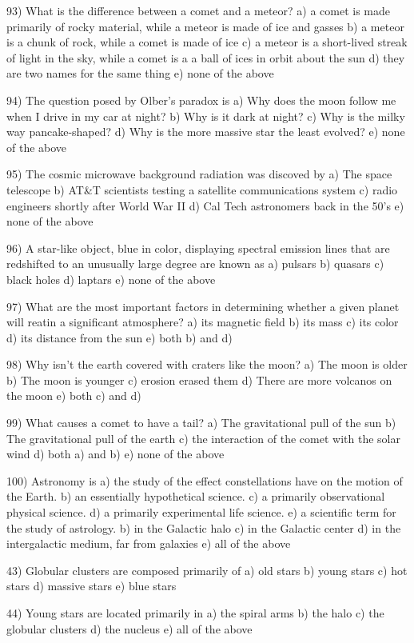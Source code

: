 93) What is the difference between a comet and a meteor?
a) a comet is made primarily of rocky material, while a meteor
is made of ice and gasses
b) a meteor is a chunk of rock, while a comet is made of ice
c) a meteor is a short-lived streak of light in the sky, while
a comet is a a ball of ices in orbit about the sun
d) they are two names for the same thing
e) none of the above

94) The question posed by Olber's paradox is
a) Why does the moon follow me when I drive in my car at night?
b) Why is it dark at night?
c) Why is the milky way pancake-shaped?
d) Why is the more massive star the least evolved?
e) none of the above

95) The cosmic microwave background radiation was discoved by
a) The space telescope
b) AT&T scientists testing a satellite communications system
c) radio engineers shortly after World War II
d) Cal Tech astronomers back in the 50's
e) none of the above

96) A star-like object, blue in color, displaying spectral emission lines
that are redshifted to an unusually large degree are known as
a) pulsars b) quasars c) black holes d) laptars e) none of the above

97) What are the most important factors in determining whether a given planet
will reatin a significant atmosphere?
a) its magnetic field
b) its mass
c) its color
d) its distance from the sun
e) both b) and d)

98) Why isn't the earth covered with craters like the moon?
a) The moon is older
b) The moon is younger
c) erosion erased them
d) There are more volcanos on the moon
e) both c) and d)

99) What causes a comet to have a tail?
a) The gravitational pull of the sun
b) The gravitational pull of the earth
c) the interaction of the comet with the solar wind
d) both a) and b)
e) none of the above

100) Astronomy is
a) the study of the effect constellations have on the motion of the Earth.
b) an essentially hypothetical science.
c) a primarily observational physical science.
d) a primarily experimental life science.
e) a scientific term for the study of astrology.
b) in the Galactic halo
c) in the Galactic center
d) in the intergalactic medium, far from galaxies
e) all of the above

43) Globular clusters are composed primarily of
a) old stars b) young stars c) hot stars d) massive stars e) blue stars

44) Young stars are located primarily in
a) the spiral arms b) the halo c) the globular clusters
d) the nucleus e) all of the above

